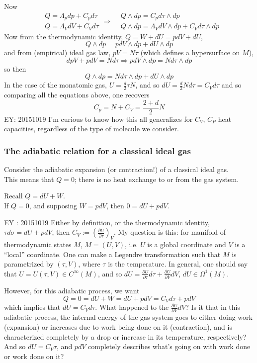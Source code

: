 \documentclass[10pt]{amsart}
\begin{document}
\begin{multicols*}{2}
Now 
\[
\begin{aligned}
  & Q = \Lambda_p dp + C_p d\tau \\ 
  & Q = \Lambda_V dV + C_V d\tau
\end{aligned} \Longrightarrow \begin{aligned}
  & Q \wedge dp = C_p d\tau \wedge dp \\ 
  & Q \wedge dp = \Lambda_V dV \wedge dp + C_V d\tau \wedge dp
\end{aligned}
\]
Now from the thermodynamic identity, $Q = W + dU = pdV + dU$,
\[
Q \wedge dp = p dV \wedge dp + dU \wedge dp
\]
and from (empirical) ideal gas law, $pV = N\tau$ (which defines a hypersurface on $M$),
\[
dp V + p dV = N d\tau \Longrightarrow p dV \wedge dp = N d\tau \wedge dp
\]
so then
\[
Q \wedge dp = N d\tau \wedge dp + dU \wedge dp
\]
In the case of the monatomic gas, $U = \frac{d}{2} \tau N$, and so $dU = \frac{d}{2} N d\tau = C_V d\tau$ and so comparing all the equations above, one recovers
\[
C_p = N + C_V = \frac{2+d}{2} N
\]
EY: 20151019 I'm curious to know how this all generalizes for $C_V$, $C_P$ heat capacities, regardless of the type of molecule we consider.  


\subsubsection*{The adiabatic relation for a classical ideal gas}

Consider the adiabatic expansion (or contraction!) of a classical ideal gas.  \\
This means that $Q=0$; there is no heat exchange to or from the gas system.  

Recall $Q = dU + W$.  \\
If $Q=0$, and supposing $W = pdV$, then $0 = dU + pdV$.  

EY : 20151019 Either by definition, or the thermodynamic identity, $\tau d\sigma = dU + pdV$, then $C_V := \left( \frac{ \partial U}{ \partial \tau} \right)_V$.  My question is this: for manifold of thermodynamic states $M$, $M=(U,V)$, i.e. $U$ is a global coordinate and $V$ is a ``local'' coordinate.  One can make a Legendre transformation such that $M$ is parametrized by $(\tau,V)$, where $\tau$ is the temperature.  In general, one should say that $U=U(\tau,V) \in C^{\infty}(M)$, and so $dU = \frac{ \partial U }{ \partial \tau} d\tau + \frac{ \partial U}{ \partial V} dV$, $dU \in \Omega^1(M)$.    

However, for this adiabatic process, we want
\[
Q = 0 = dU + W = dU + pdV = C_V d\tau + pdV
\]
which implies that $dU = C_V d\tau$.  What happened to the $\frac{ \partial U}{ \partial V} dV$? Is it that in this adiabatic process, the internal energy of the gas system goes to either doing work (expansion) or increases due to work being done on it (contraction), and is characterized completely by a drop or increase in its temperature, respectively?  And so $dU = C_V \tau$, and $pdV$ completely describes what's going on with work done or work done on it?


\end{multicols*}
\end{document}
